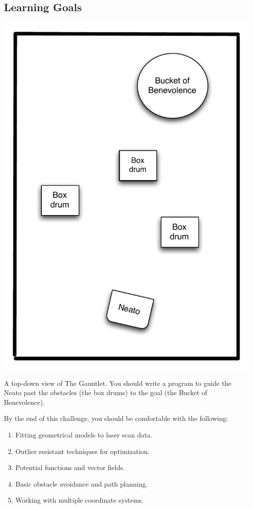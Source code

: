 \documentclass{tufte-handout}
\begin{document}
\subsection{Learning Goals}
\begin{marginfigure}
\includegraphics[width=\linewidth]{Figures/gauntlet}
\caption{A top-down view of The Gauntlet\texttrademark.  You should write a program to guide the Neato past the obstacles (the box drums) to the goal (the Bucket of Benevolence\texttrademark).\label{fig:gauntlet}}
\end{marginfigure}
By the end of this challenge, you should be comfortable with the following:
\begin{enumerate}
\item Fitting geometrical models to laser scan data.
\item Outlier resistant techniques for optimization.
\item Potential functions and vector fields.
\item Basic obstacle avoidance and path planning.
\item Working with multiple coordinate systems.
\end{enumerate}
\end{document}
